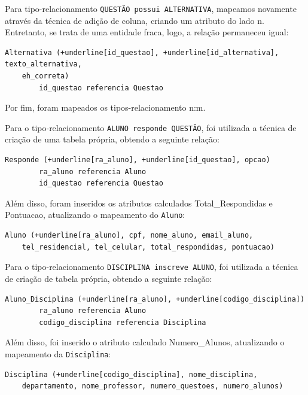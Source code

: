 \documentclass[12pt,a4paper]{article}
\begin{document}
Para tipo-relacionamento \texttt{QUESTÃO possui ALTERNATIVA}, mapeamos novamente através da técnica de adição de coluna, criando um atributo do lado n. Entretanto, se trata de uma entidade fraca, logo, a relação permaneceu igual:

\begin{Verbatim}[commandchars=+\[\]]
    Alternativa (+underline[id_questao], +underline[id_alternativa], texto_alternativa, 
    eh_correta)
        id_questao referencia Questao
\end{Verbatim}

Por fim, foram mapeados os tipos-relacionamento n:m.

Para o tipo-relacionamento \texttt{ALUNO responde QUESTÃO}, foi utilizada a técnica de criação de uma tabela própria, obtendo a seguinte relação:

\begin{Verbatim}[commandchars=+\[\]]
    Responde (+underline[ra_aluno], +underline[id_questao], opcao)
        ra_aluno referencia Aluno
        id_questao referencia Questao
\end{Verbatim}

Além disso, foram inseridos os atributos calculados Total\_Respondidas e Pontuacao, atualizando o mapeamento do \texttt{Aluno}:

\begin{Verbatim}[commandchars=+\[\]]
    Aluno (+underline[ra_aluno], cpf, nome_aluno, email_aluno, 
    tel_residencial, tel_celular, total_respondidas, pontuacao)
\end{Verbatim}

Para o tipo-relacionamento \texttt{DISCIPLINA inscreve ALUNO}, foi utilizada a técnica de criação de tabela própria, obtendo a seguinte relação:

\begin{Verbatim}[commandchars=+\[\]]
    Aluno_Disciplina (+underline[ra_aluno], +underline[codigo_disciplina])
        ra_aluno referencia Aluno
        codigo_disciplina referencia Disciplina
\end{Verbatim}

Além disso, foi inserido o atributo calculado Numero\_Alunos, atualizando o mapeamento da \texttt{Disciplina}:

\begin{Verbatim}[commandchars=+\[\]]
    Disciplina (+underline[codigo_disciplina], nome_disciplina,
    departamento, nome_professor, numero_questoes, numero_alunos)
\end{Verbatim}
\end{document}
